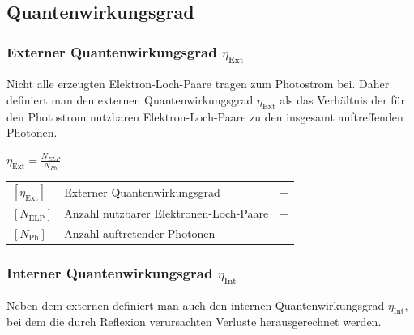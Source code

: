 \subsection{Quantenwirkungsgrad}



\subsubsection{Externer Quantenwirkungsgrad $\eta_{\mathrm{Ext}}$}

Nicht alle erzeugten Elektron-Loch-Paare tragen zum Photostrom bei. Daher definiert man den externen Quantenwirkungsgrad \( \eta_\text{Ext} \) als das Verhältnis der für den Photostrom nutzbaren Elektron-Loch-Paare zu den insgesamt auftreffenden Photonen.

\vspace{0.1cm}

\begin{minipage}[t]{0.2\columnwidth}
$
\boxed{\eta_{\text{Ext}} = \frac{N_{ELP}}{N_{Ph}}}
$
\end{minipage}
\hfill
\begin{minipage}[t]{0.78\columnwidth}
    \renewcommand{\arraystretch}{1.2}
\begin{tabular}{@{} l p{5.5cm} l @{}}
    $[\eta_{\mathrm{Ext}}]$   & Externer Quantenwirkungsgrad  \dotfill & $\mathrm{-}$ \\
    $[N_{\mathrm{ELP}}]$    & Anzahl nutzbarer Elektronen-Loch-Paare        \dotfill & $\mathrm{-}$ \\
    $[N_{\mathrm{Ph}}]$       & Anzahl auftretender Photonen  \dotfill & $\mathrm{-}$ \\
\end{tabular}
\end{minipage}


\subsubsection{Interner Quantenwirkungsgrad $\eta_{\mathrm{Int}}$}

Neben dem externen definiert man auch den internen Quantenwirkungsgrad \( \eta_\text{Int} \), bei dem die durch Reflexion verursachten Verluste herausgerechnet werden.

\vspace{0.1cm}


